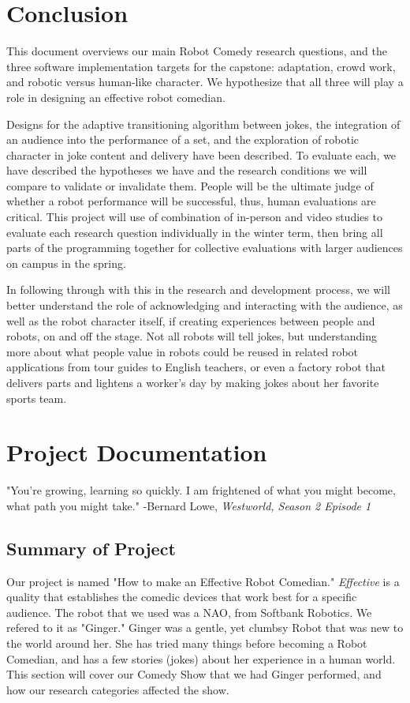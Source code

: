 \documentclass[onecolumn, draftclsnofoot,10pt, compsoc]{IEEEtran}
\begin{document}
\section{Conclusion}
This document overviews our main Robot Comedy research questions, and the three software implementation targets
for the capstone: adaptation, crowd work, and robotic versus human-like character. We hypothesize that all three will
play a role in designing an effective robot comedian.

Designs for the adaptive transitioning algorithm between jokes, the integration of an audience into the performance
of a set, and the exploration of robotic character in joke content and delivery have been described. To evaluate each,
we have described the hypotheses we have and the research conditions we will compare to validate or invalidate them.
People will be the ultimate judge of whether a robot performance will be successful, thus, human evaluations are critical.
This project will use of combination of in-person and video studies to evaluate each research question individually in
the winter term, then bring all parts of the programming together for collective evaluations with larger audiences on
campus in the spring.

In following through with this in the research and development process, we will better understand the role of
acknowledging and interacting with the audience, as well as the robot character itself, if creating experiences between
people and robots, on and off the stage. Not all robots will tell jokes, but understanding more about what people value
in robots could be reused in related robot applications from tour guides to English teachers, or even a factory robot that
delivers parts and lightens a worker’s day by making jokes about her favorite sports team.

\section{Project Documentation}

	\begin{displayquote}
	"You're growing, learning so quickly. I am frightened of what you might become, what path you might take."
	-Bernard Lowe, \textit{Westworld, Season 2 Episode 1}
	\end{displayquote}

\subsection{Summary of Project}
Our project is named "How to make an Effective Robot Comedian." 
\textit{Effective} is a quality that establishes the comedic devices that work best for a specific audience.
The robot that we used was a NAO, from Softbank Robotics. We refered to it as "Ginger." 
Ginger was a gentle, yet clumbsy Robot that was new to the world around her.
She has tried many things before becoming a Robot Comedian, and has a few stories (jokes) about her experience in a human world.
This section will cover our Comedy Show that we had Ginger performed, and how our research categories affected the show.
\end{document}
